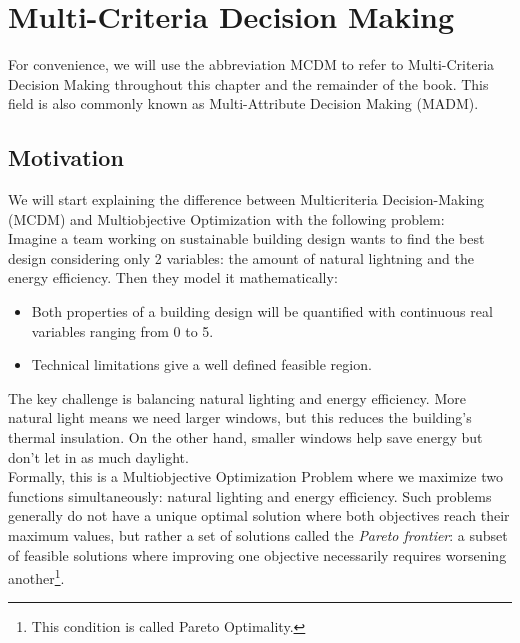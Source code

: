 \chapter{Multi-Criteria Decision Making}

For convenience, we will use the abbreviation MCDM to refer to Multi-Criteria Decision Making throughout this chapter and the remainder of the book. This field is also commonly known as Multi-Attribute Decision Making (MADM).



\section*{Motivation}
We will start explaining the difference between Multicriteria Decision-Making (MCDM) and Multiobjective Optimization with the following problem:\\

Imagine a team working on \textnormal{sustainable building design} wants to find the best design considering only 2 variables: the amount of natural lightning and the energy efficiency. Then they model it mathematically:\vspace{-0.7em}
\begin{itemize}
    \item Both properties of a building design will be quantified with continuous real variables ranging from 0 to 5.\vspace{-0.8em}
    \item Technical limitations give a well defined feasible region.\vspace{-0.7em}
\end{itemize}
The key challenge is balancing natural lighting and energy efficiency. More natural light means we need larger windows, but this reduces the building's thermal insulation. On the other hand, smaller windows help save energy but don't let in as much daylight.\\

Formally, this is a Multiobjective Optimization Problem where we maximize two functions simultaneously: natural lighting and energy efficiency. Such problems generally do not have a unique optimal solution where both objectives reach their maximum values, but rather a set of solutions called the \textit{Pareto frontier}: a subset of feasible solutions where improving one objective necessarily requires worsening another\footnote{This condition is called Pareto Optimality.}.\\

